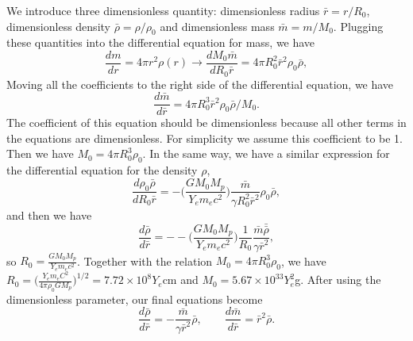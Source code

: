 \documentclass{article}
\begin{document}
We introduce three dimensionless quantity: dimensionless radius $\bar{r} = r/R_0$, dimensionless density $\bar{\rho} = \rho/\rho_0$ and dimensionless mass $\bar{m} = m/M_0$.  Plugging these quantities into the differential equation for mass, we have
\begin{equation}
\frac{dm}{dr}=4\pi r^2 \rho(r)  \rightarrow \frac{dM_0 \bar{m}}{dR_0 \bar{r}}= 4\pi R_0^2 \bar{r}^2 \rho_0 \bar{\rho},
\end{equation}
Moving all the coefficients to the right side of the differential equation, we have 
\begin{equation}
\frac{d\bar{m}}{d\bar{r}}=4\pi R_0^3 \bar{r}^2  \rho_0  \bar{\rho}/M_0.
\end{equation}
The coefficient of this equation should be dimensionless because all other terms in the equations are dimensionless. For simplicity we assume this coefficient to be 1. Then we have $M_0 = 4\pi R_0^3 \rho_0$. 
In the same way, we have a similar expression for the differential equation for the density $\rho$,
\begin{equation}
\frac{d\rho_0 \bar{\rho}}{dR_0 \bar{r}} = -\big(   \frac{GM_0M_p}{Y_e m_e  c^2} \big)  \frac{\bar{m}}{\gamma R_0^2 \bar{r}^2} \rho_0 \bar{\rho},
\end{equation}
and then we have 
\begin{equation}
\frac{d \bar{\rho}}{d \bar{r}}= - -\big(   \frac{GM_0M_p}{Y_e m_e  c^2} \big) \frac{1}{R_0} \frac{\bar{m} \bar{\bar{\rho}}}{\gamma \bar{r}^2},
\end{equation}
so $R_0 =\frac{GM_0M_p}{Y_e m_e  c^2} $. Together with the relation $M_0 = 4\pi R_0^3 \rho_0$, we have $R_0=\big(\frac{Y_e m_e C^2}{4\pi \rho_0 G M_p} \big)^{1/2} = 7.72 \times 10^8 Y_e$cm and $M_0 =5.67 \times 10^{33} Y_e^2$g. After using the dimensionless parameter, our final equations become
\begin{equation}
\frac{d\bar{\rho}}{d\bar{r}} = - \frac{\bar{m}}{\gamma \bar{r}^2} \bar{\rho},    \qquad      \frac{d \bar{m}}{d \bar{r}}=\bar{r}^2 \bar{\rho}.
\end{equation}
\end{document}

